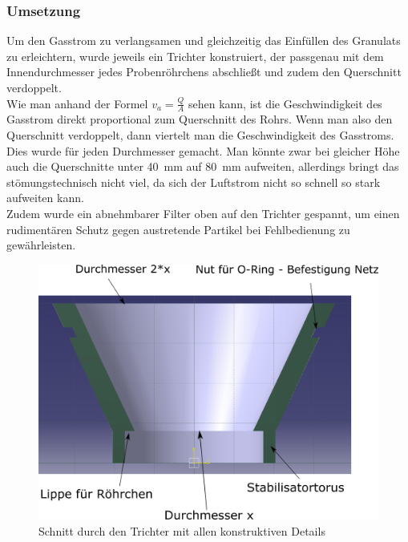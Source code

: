 \subsubsection{Umsetzung}

Um den Gasstrom zu verlangsamen und gleichzeitig das Einfüllen des Granulats zu erleichtern, wurde jeweils ein Trichter konstruiert, der passgenau mit dem Innendurchmesser jedes Probenröhrchens abschließt und zudem den Querschnitt verdoppelt. \\
Wie man anhand der Formel $v_a = \frac{Q}{A}$ \cite{Grollius2012} sehen kann, ist die Geschwindigkeit des Gasstrom direkt proportional zum Querschnitt des Rohrs. Wenn man also den Querschnitt verdoppelt, dann viertelt man die Geschwindigkeit des Gasstroms. Dies wurde für jeden Durchmesser gemacht. Man könnte zwar bei gleicher Höhe auch die Querschnitte unter \SI{40}{mm} auf \SI{80}{mm} aufweiten, allerdings bringt das stömungstechnisch nicht viel, da sich der Luftstrom nicht so schnell so stark aufweiten kann. \\
Zudem wurde ein abnehmbarer Filter oben auf den Trichter gespannt, um einen rudimentären Schutz gegen austretende Partikel bei Fehlbedienung zu gewährleisten.

\begin{figure}[h]
	\begin{center}
		\includegraphics[scale=0.5]{Schnitt_Trichter.png}
		\caption[Skizze Trichter]{Schnitt durch den Trichter mit allen konstruktiven Details}
	\end{center}
\end{figure}


